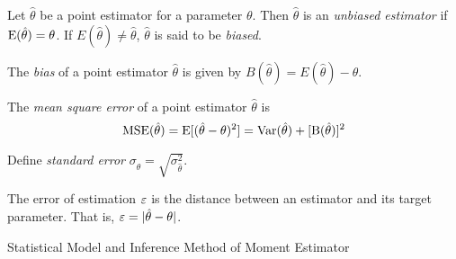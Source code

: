 Let $\hat{\theta}$ be a point estimator for a parameter $\theta$. Then $\hat{\theta}$ is an \textit{unbiased estimator} if $\mathrm{E}(\hat{\theta}) = \theta$. If $E(\hat{\theta}) \neq \hat{\theta}$, $\hat{\theta}$ is said to be \textit{biased}.

The \textit{bias} of a point estimator $\hat{\theta}$ is given by $B(\hat{\theta}) = E(\hat{\theta})-\theta$.

The \textit{mean square error} of a point estimator $\hat{\theta}$ is
\[\mathrm{MSE}(\hat{\theta})=\mathrm{E}[(\hat{\theta}-\theta)^2]=\mathrm{Var}(\hat{\theta})+ [\mathrm{B}(\hat{\theta})]^2\]

Define \textit{standard error} $\sigma_{\hat\theta}=\sqrt{\sigma^2_{\hat\theta}}$.


The error of estimation $\varepsilon$ is the distance between an estimator and its target parameter. That is, $\varepsilon = |\hat{\theta}-\theta|$.


Statistical Model and Inference
Method of Moment Estimator